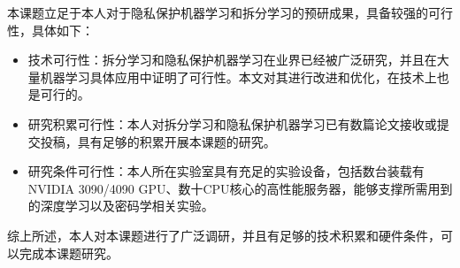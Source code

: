 本课题立足于本人对于隐私保护机器学习和拆分学习的预研成果，具备较强的可行性，具体如下：
\begin{itemize}
    \item 技术可行性：拆分学习和隐私保护机器学习在业界已经被广泛研究，并且在大量机器学习具体应用中证明了可行性。本文对其进行改进和优化，在技术上也是可行的。
    \item 研究积累可行性：本人对拆分学习和隐私保护机器学习已有数篇论文接收或提交投稿，具有足够的积累开展本课题的研究。
    \item 研究条件可行性：本人所在实验室具有充足的实验设备，包括数台装载有NVIDIA 3090/4090 GPU、数十CPU核心的高性能服务器，能够支撑所需用到的深度学习以及密码学相关实验。
\end{itemize}

综上所述，本人对本课题进行了广泛调研，并且有足够的技术积累和硬件条件，可以完成本课题研究。